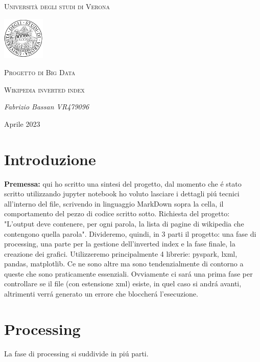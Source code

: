 \documentclass[12pt,a4paper]{article}
\begin{document}
    \begin{titlepage}
    	\centering
        {\textsc{Università degli studi di Verona} \par}
        \par\vspace{1cm}
    	\includegraphics[width=0.15\textwidth]{logoUni.png}
        \par
    	\vspace{1cm}
    	{\Large \textsc{Progetto di Big Data}\par}
    	\vspace{1cm}
        {\Large \textsc{Wikipedia inverted index}\par}
    	\vspace{5cm}
    	{\Large\itshape Fabrizio Bassan VR479096\par}
    	\vfill
    	{\large Aprile 2023 \par}
    \end{titlepage}
    
    \tableofcontents
    \newpage
    \section{Introduzione}
    \textbf{Premessa:} qui ho scritto una sintesi del progetto, dal momento che é stato scritto utilizzando jupyter notebook ho voluto lasciare i dettagli piú tecnici all'interno del file, scrivendo in linguaggio MarkDown sopra la cella, il comportamento del pezzo di codice scritto sotto.
    \newline
    Richiesta del progetto: "L’output deve contenere, per ogni parola, la lista di pagine di wikipedia che contengono quella parola".
    Divideremo, quindi, in 3 parti il progetto: una fase di processing, una parte per la gestione dell'inverted index e la fase finale, la creazione dei grafici.
    Utilizzeremo principalmente 4 librerie: pyspark, lxml, pandas, matplotlib.
    Ce ne sono altre ma sono tendenzialmente di contorno a queste che sono praticamente essenziali.
    \newline
    Ovviamente ci sará una prima fase per controllare se il file (con estensione xml) esiste, in quel caso si andrá avanti, altrimenti verrá generato un errore che bloccherá l'esecuzione.
    \section{Processing}
    La fase di processing si suddivide in piú parti.
\end{document}
